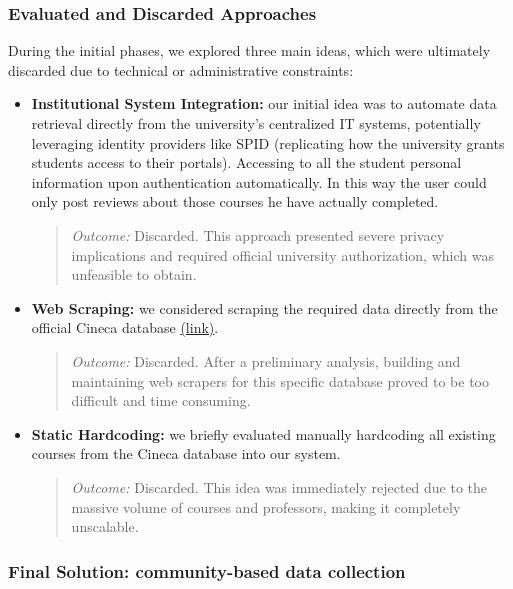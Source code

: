 \subsubsection{Evaluated and Discarded Approaches}

During the initial phases, we explored three main ideas, which were ultimately discarded due to technical or administrative constraints:

\begin{itemize}[leftmargin=*]
	\item \textbf{Institutional System Integration:} our initial idea was to automate data retrieval directly from the university's centralized IT systems, potentially leveraging identity providers like SPID (replicating how the university grants students access to their portals). Accessing to all the student personal information upon authentication automatically. In this way the user could only post reviews about those courses he have actually completed.
	\begin{quote}
		\textit{Outcome:} Discarded. This approach presented severe privacy implications and required official university authorization, which was unfeasible to obtain.
	\end{quote}
	
	\item \textbf{Web Scraping:} we considered scraping the required data directly from the official Cineca database \href{https://unifi.coursecatalogue.cineca.it}{(link)}.
	\begin{quote}
		\textit{Outcome:} Discarded. After a preliminary analysis, building and maintaining web scrapers for this specific database proved to be too difficult and time consuming.
	\end{quote}
	
	\item \textbf{Static Hardcoding:} we briefly evaluated manually hardcoding all existing courses from the Cineca database into our system.
	\begin{quote}
		\textit{Outcome:} Discarded. This idea was immediately rejected due to the massive volume of courses and professors, making it completely unscalable.
	\end{quote}
\end{itemize}

\subsubsection{Final Solution: community-based data collection}

